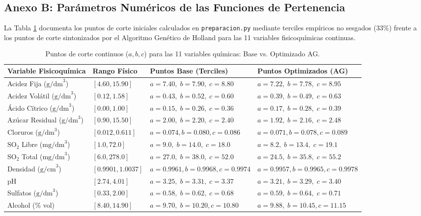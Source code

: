 \documentclass{article}
\begin{document}
\subsection{Anexo B: Parámetros Numéricos de las Funciones de Pertenencia}

La Tabla \ref{tab:anexo_mfs} documenta los puntos de corte iniciales calculados en \texttt{preparacion.py} mediante terciles empíricos no sesgados ($33\%$) frente a los puntos de corte sintonizados por el Algoritmo Genético de Holland para las 11 variables fisicoquímicas continuas.

\begin{table}[H]
\centering
\caption{Puntos de corte continuos ($a, b, c$) para las 11 variables químicas: Base vs. Optimizado AG.}
\label{tab:anexo_mfs}
\small
\begin{tabularx}{\textwidth}{lXXX}
\toprule
\textbf{Variable Fisicoquímica} & \textbf{Rango Físico} & \textbf{Puntos Base (Terciles)} & \textbf{Puntos Optimizados (AG)} \\
\midrule
Acidez Fija ($\text{g/dm}^3$) & $[4.60, 15.90]$ & $a=7.40, \; b=7.90, \; c=8.80$ & $a=7.22, \; b=7.78, \; c=8.95$ \\
Acidez Volátil ($\text{g/dm}^3$) & $[0.12, 1.58]$ & $a=0.43, \; b=0.52, \; c=0.60$ & $a=0.39, \; b=0.49, \; c=0.63$ \\
Ácido Cítrico ($\text{g/dm}^3$) & $[0.00, 1.00]$ & $a=0.15, \; b=0.26, \; c=0.36$ & $a=0.17, \; b=0.28, \; c=0.39$ \\
Azúcar Residual ($\text{g/dm}^3$) & $[0.90, 15.50]$ & $a=2.00, \; b=2.20, \; c=2.40$ & $a=1.92, \; b=2.16, \; c=2.48$ \\
Cloruros ($\text{g/dm}^3$) & $[0.012, 0.611]$ & $a=0.074, b=0.080, c=0.086$ & $a=0.071, b=0.078, c=0.089$ \\
$\text{SO}_2$ Libre ($\text{mg/dm}^3$) & $[1.0, 72.0]$ & $a=9.0, \; b=14.0, \; c=18.0$ & $a=8.2, \; b=13.4, \; c=19.1$ \\
$\text{SO}_2$ Total ($\text{mg/dm}^3$) & $[6.0, 278.0]$ & $a=27.0, \; b=38.0, \; c=52.0$ & $a=24.5, \; b=35.8, \; c=55.2$ \\
Densidad ($\text{g/cm}^3$) & $[0.9901, 1.0037]$ & $a=0.9961, b=0.9968, c=0.9974$ & $a=0.9957, b=0.9965, c=0.9978$ \\
pH & $[2.74, 4.01]$ & $a=3.25, \; b=3.31, \; c=3.37$ & $a=3.21, \; b=3.29, \; c=3.40$ \\
Sulfatos ($\text{g/dm}^3$) & $[0.33, 2.00]$ & $a=0.58, \; b=0.62, \; c=0.68$ & $a=0.59, \; b=0.64, \; c=0.71$ \\
Alcohol (\% vol) & $[8.40, 14.90]$ & $a=9.70, \; b=10.20, c=10.80$ & $a=9.88, \; b=10.45, c=11.15$ \\
\bottomrule
\end{tabularx}
\end{table}
\end{document}
